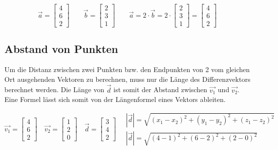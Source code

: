 \begin{equation*}
    \vec{a} =
    \begin{bmatrix}
        4 \\
        6 \\
        2
    \end{bmatrix}
    \qquad
    \vec{b} =
    \begin{bmatrix}
        2 \\
        3 \\
        1
    \end{bmatrix}
    \qquad
    \vec{a} =
    2 \cdot \vec{b} =
    2 \cdot
    \begin{bmatrix}
        2 \\
        3 \\
        1
    \end{bmatrix}
    =
    \begin{bmatrix}
        4 \\
        6 \\
        2
    \end{bmatrix}
\end{equation*}

\subsection{Abstand von Punkten}

Um die Distanz zwischen zwei Punkten bzw. den Endpunkten von 2 vom gleichen Ort
ausgehenden Vektoren zu berechnen, muss nur die Länge des Differenzvektors berechnet
werden. Die Länge von $\vec{d}$ ist somit der Abstand zwischen
$\vec{v_1}$ und $\vec{v_2}$.
Eine Formel lässt sich somit von der Längenformel eines Vektors ableiten.

\begin{equation*}
    \vec{v_1} =
    \begin{bmatrix}
        4 \\
        6 \\
        2
    \end{bmatrix}
    \quad
    \vec{v_2} =
    \begin{bmatrix}
        1 \\
        2 \\
        0
    \end{bmatrix}
    \quad
    \vec{d} =
    \begin{bmatrix}
        3 \\
        4 \\
        2
    \end{bmatrix}
    \quad
    \begin{aligned}
        | \vec{d} | = \sqrt{(x_1 - x_2)^2 + (y_1 - y_2)^2 + (z_1 - z_2)^2} \\
        | \vec{d} | = \sqrt{(4 - 1)^2 + (6 - 2)^2 + (2 - 0)^2}
    \end{aligned}
\end{equation*}

